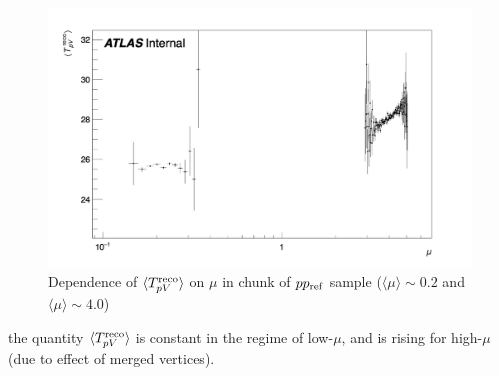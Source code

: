 




\begin{figure}[h]
    \centering
    \includegraphics[width=1.0\linewidth]{images/TPVreco_bothmu.png}
    \caption{Dependence of $\langle T_{pV}^\text{reco} \rangle$ on $\mu$ in chunk of $pp_{\mathrm{ref}}$ sample ($\langle \mu \rangle\sim 0.2$ and $\langle \mu\rangle\sim 4.0$)}
    \label{fig:tpvreco_bothmu}
\end{figure}
the quantity $\langle T_{pV}^\text{reco} \rangle$ is constant in the regime of low-$\mu$, and is rising for high-$\mu$ (due to effect of merged vertices). 


